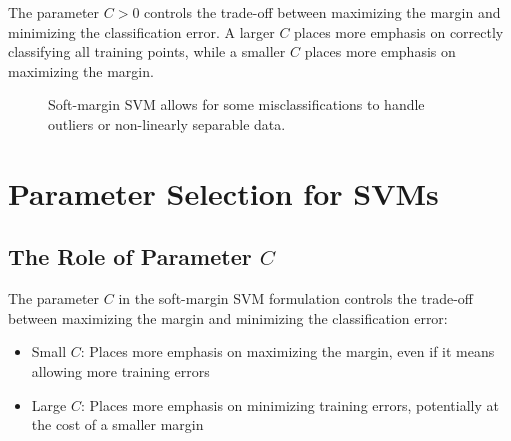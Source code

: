 \documentclass{article}
\begin{document}
The parameter $C > 0$ controls the trade-off between maximizing the margin and minimizing the classification error. A larger $C$ places more emphasis on correctly classifying all training points, while a smaller $C$ places more emphasis on maximizing the margin.

\begin{figure}[h]
\centering
{}
\caption{Soft-margin SVM allows for some misclassifications to handle outliers or non-linearly separable data.}
\end{figure}

\section{Parameter Selection for SVMs}

\subsection{The Role of Parameter $C$}
The parameter $C$ in the soft-margin SVM formulation controls the trade-off between maximizing the margin and minimizing the classification error:

\begin{itemize}
    \item Small $C$: Places more emphasis on maximizing the margin, even if it means allowing more training errors
    \item Large $C$: Places more emphasis on minimizing training errors, potentially at the cost of a smaller margin
\end{itemize}
\end{document}
